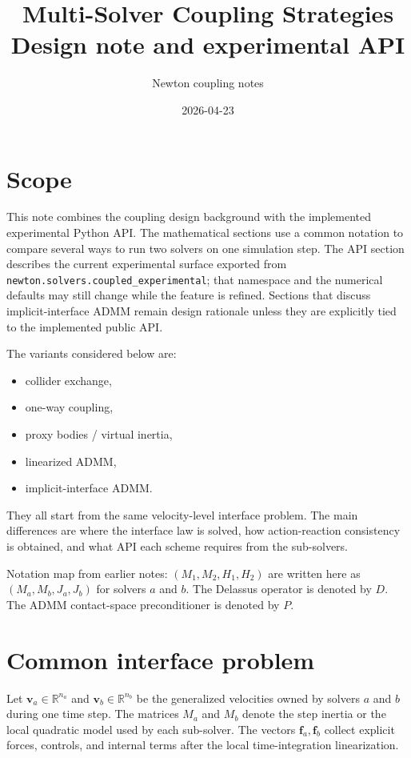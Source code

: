 \documentclass[11pt]{article}
\title{Multi-Solver Coupling Strategies \\
       \large Design note and experimental API}
\author{Newton coupling notes}
\date{2026-04-23}
\newcommand{\va}{\bm v_a}
\newcommand{\vb}{\bm v_b}
\newcommand{\fa}{\bm f_a}
\newcommand{\fb}{\bm f_b}
\newcommand{\Ja}{J_a}
\newcommand{\Jb}{J_b}
\newcommand{\Ma}{M_a}
\newcommand{\Mb}{M_b}
\newcommand{\Dop}{D}
\newcommand{\Pmat}{P}
\begin{document}
\maketitle

\section{Scope}

This note combines the coupling design background with the implemented experimental
Python API. The mathematical sections use a common notation to compare several
ways to run two solvers on one simulation step. The API section describes the
current experimental surface exported from
\texttt{newton.solvers.coupled\_experimental}; that namespace and the numerical
defaults may still change while the feature is refined. Sections that discuss
implicit-interface ADMM remain design rationale unless they are explicitly tied
to the implemented public API.

The variants considered below are:
\begin{itemize}
\item collider exchange,
\item one-way coupling,
\item proxy bodies / virtual inertia,
\item linearized ADMM,
\item implicit-interface ADMM.
\end{itemize}
They all start from the same velocity-level interface problem. The main differences
are where the interface law is solved, how action-reaction consistency is obtained, and
what API each scheme requires from the sub-solvers.

Notation map from earlier notes: $(M_1,M_2,H_1,H_2)$ are written here as
$(\Ma,\Mb,\Ja,\Jb)$ for solvers $a$ and $b$. The Delassus operator is denoted by
$\Dop$. The ADMM contact-space preconditioner is denoted by $\Pmat$.

\section{Common interface problem}

Let $\va\in\mathbb R^{n_a}$ and $\vb\in\mathbb R^{n_b}$ be the generalized velocities
owned by solvers $a$ and $b$ during one time step. The matrices $\Ma$ and $\Mb$ denote
the step inertia or the local quadratic model used by each sub-solver. The vectors
$\fa,\fb$ collect explicit forces, controls, and internal terms after the local
time-integration linearization.
\end{document}
